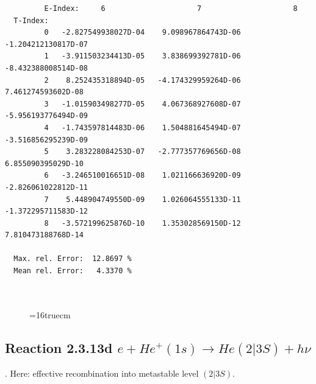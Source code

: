 \documentclass[12pt,dvips]{article}
\begin{document}
\begin{small}
\begin{verbatim}
         E-Index:     6                     7                     8
  T-Index:
         0   -2.827549938027D-04    9.098967864743D-06   -1.204212130817D-07
         1   -3.911503234413D-05    3.838699392781D-06   -8.432388008514D-08
         2    8.252435318894D-05   -4.174329959264D-06    7.461274593602D-08
         3   -1.015903498277D-05    4.067368927608D-07   -5.956193776494D-09
         4   -1.743597814483D-06    1.504881645494D-07   -3.516856295239D-09
         5    3.283228084253D-07   -2.777357769656D-08    6.855090395029D-10
         6   -3.246510016651D-08    1.021166636920D-09   -2.826061022812D-11
         7    5.448904749550D-09    1.026064555133D-11   -1.372295711583D-12
         8   -3.572199625876D-10    1.353028569150D-12    7.810473188768D-14

  Max. rel. Error:  12.8697 %
  Mean rel. Error:   4.3370 %



\end{verbatim}\end{small}
\begin{figure} \label{2.3.13c}
\epsfxsize=16truecm
\end{figure}
\newpage

\subsection{
Reaction 2.3.13d  $e + He^+(1s) \rightarrow He(2|3S) + h\nu $ }
\cite{kn:Fujimoto}. Here: effective recombination into metastable
level $(2|3S)$.
\end{document}
